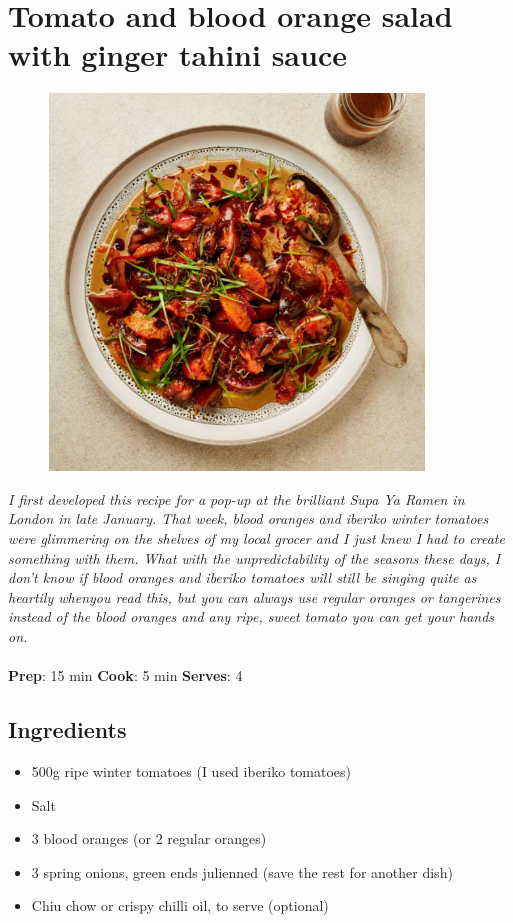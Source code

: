 \documentclass{book}
\begin{document}
\section{Tomato and blood orange salad with ginger tahini sauce}
\begin{figure}
\centering\includegraphics[width=10cm,height=10cm,keepaspectratio]{Recipe_Pictures/Tomato_and_blood_orange_salad_with_ginger_tahini_sauce.png}
\end{figure}
\emph{I first developed this recipe for a pop-up at the brilliant Supa Ya Ramen in London in late January. That week, blood oranges and iberiko winter tomatoes were glimmering on the shelves of my local grocer and I just knew I had to create something with them. What with the unpredictability of the seasons these days, I don’t know if blood oranges and iberiko tomatoes will still be singing quite as heartily whenyou read this, but you can always use regular oranges or tangerines instead of the blood oranges and any ripe, sweet tomato you can get your hands on.}\\\\ 
\textbf{Prep}: 15 min
\textbf{Cook}: 5 min
\textbf{Serves}: 4
\subsection*{Ingredients}
\begin{itemize}
\item 500g ripe winter tomatoes (I used iberiko tomatoes)
\item Salt
\item 3 blood oranges (or 2 regular oranges)
\item 3 spring onions, green ends julienned (save the rest for another dish)
\item Chiu chow or crispy chilli oil, to serve (optional)
\end{itemize}
\end{document}
